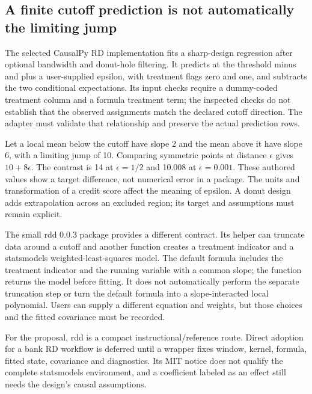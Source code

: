 \subsection{A finite cutoff prediction is not automatically the limiting jump}
The selected CausalPy RD implementation fits a sharp-design regression
after optional bandwidth and donut-hole filtering. It predicts at the
threshold minus and plus a user-supplied epsilon, with treatment flags zero
and one, and subtracts the two conditional expectations. Its input checks
require a dummy-coded treatment column and a formula treatment term;
the inspected checks do not establish that the observed assignments match
the declared cutoff direction. The adapter must validate that relationship
and preserve the actual prediction rows.\citep{exec25_pyrdiv_causalpy}

Let a local mean below the cutoff have slope 2 and the mean above it have
slope 6, with a limiting jump of 10. Comparing symmetric points at distance
$\epsilon$ gives $10+8\epsilon$. The contrast is 14 at $\epsilon=1/2$ and
10.008 at $\epsilon=0.001$. These authored values show a target difference,
not numerical error in a package. The units and transformation of a credit
score affect the meaning of epsilon. A donut design adds extrapolation
across an excluded region; its target and assumptions must remain explicit.
\citep{exec25_pyrdiv_choice}

The small rdd 0.0.3 package provides a different contract. Its helper can
truncate data around a cutoff and another function creates a treatment
indicator and a statsmodels weighted-least-squares model. The default
formula includes the treatment indicator and the running variable with a
common slope; the function returns the model before fitting. It does not
automatically perform the separate truncation step or turn the default
formula into a slope-interacted local polynomial. Users can supply a
different equation and weights, but those choices and the fitted covariance
must be recorded.\citep{exec25_pyrdiv_rdd}

For the proposal, rdd is a compact instructional/reference route. Direct
adoption for a bank RD workflow is deferred until a wrapper fixes window,
kernel, formula, fitted state, covariance and diagnostics. Its MIT notice
does not qualify the complete statsmodels environment, and a coefficient
labeled as an effect still needs the design's causal assumptions.
\citep{exec25_pyrdiv_rdd,exec25_pyrdiv_choice}

